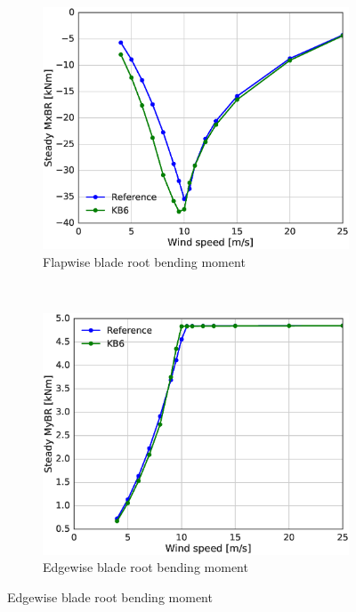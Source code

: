 \begin{figure}[tph]
\begin{subfigure}{0.50\textwidth}
\includegraphics[width=\linewidth]{figures/KB6_final/KB6_MxBR_HS2.eps}
\caption{Flapwise blade root bending moment}
\label{subfig:KB6_Mx}
\end{subfigure}
 ~
\begin{subfigure}{0.50\textwidth}
\includegraphics[width=\linewidth]{figures/KB6_final/KB6_MyBR_HS2.eps}
\caption{Edgewise blade root bending moment}
\label{subfig:KB6_My}
\end{subfigure}


\end{figure}
